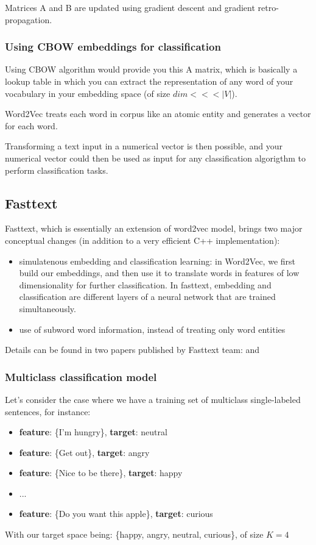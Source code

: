 Matrices A and B are updated using gradient descent and gradient retro-propagation.

\subsubsection{Using CBOW embeddings for classification}

Using CBOW algorithm would provide you this A matrix, which is basically a lookup table in which you can extract the representation of any word of your vocabulary in your embedding space (of size $dim <<< |V|$).

Word2Vec treats each word in corpus like an atomic entity and generates a vector for each word.

Transforming a text input in a numerical vector is then possible, and your numerical vector could then be used as input for any classification algorigthm to perform classification tasks.

\subsection{Fasttext}

Fasttext, which is essentially an extension of word2vec model, brings two major conceptual changes (in addition to a very efficient C++ implementation):
\begin{itemize}
	\item simulatenous embedding and classification learning: in Word2Vec, we first build our embeddings, and then use it to translate words in features of low dimensionality for further classification. In fasttext, embedding and classification are different layers of a neural network that are trained simultaneously.
	\item use of subword word information, instead of treating only word entities
\end{itemize}

Details can be found in two papers published by Fasttext team: \cite[Enriching Word Vectors with Subword Information]{fasttextEnriching} and \cite[Bag of Tricks for Efficient Text Classification]{fasttextTricks}

\subsubsection{Multiclass classification model}

Let's consider the case where we have a training set of multiclass single-labeled sentences, for instance:
\begin{itemize}
	\item \textbf{feature}: \{I'm hungry\}, \textbf{target}: neutral 
	\item \textbf{feature}: \{Get out\}, \textbf{target}: angry
	\item \textbf{feature}: \{Nice to be there\}, \textbf{target}: happy
	\item ...
	\item \textbf{feature}: \{Do you want this apple\}, \textbf{target}: curious
\end{itemize}
With our target space being: \{happy, angry, neutral, curious\}, of size $K=4$


